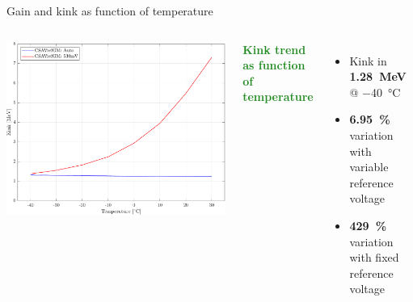 \documentclass[aspectratio=169,xcolor=dvipsnames,handout]{beamer} %
\newcommand{\xmark}{\ding{55}}
\newcommand{\greencheck}{{\color{ForestGreen}\checkmark}}
\newcommand{\redcross}{{\color{Red}\xmark}}
\begin{document}
\begin{frame}{Gain and kink as function of temperature}
\begin{columns}
            \begin{columns}
                \addtolength{\leftmargini}{\labelsep}
                    \vskip0.1cm
                    \centering
                    \includegraphics[width=1.1\textwidth]{images/temperature_effects/plot_pedestal_gain_auto_530mV.pdf}
                    
                    \textcolor{ForestGreen}{\textbf{Kink trend as function of temperature}}
                    \vspace{0.1cm}
                    \begin{itemize}
                        \item Kink in \textbf{\SI{1.28}{\mega\electronvolt}} @ \SI{-40}{\celsius}
                        \item \textbf{\SI{6.95}{\percent}} variation with variable reference voltage \greencheck
                        \item \textbf{\SI{429}{\percent}} variation with fixed reference voltage \redcross
                    \end{itemize}
            \end{columns}
            \vspace{0.5cm}
    \end{columns}
\end{frame}


\end{document}
